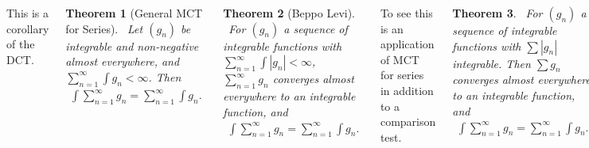 \documentclass{tikzposter} %
\newtheorem{theorem}{Theorem}
\begin{document}
\begin{columns}
{    This is a corollary of the DCT. \\

    \hphantom{}

    \begin{theorem}[General MCT for Series]
      \ Let $(g_{n})$ be integrable and non-negative almost everywhere, and $\sum_{n=1}^{\infty} \int g_{n} < \infty$. Then
      \begin{align*}
        \int \sum_{n=1}^{\infty} g_{n} = \sum_{n=1}^{\infty} \int g_{n}.
      \end{align*}
    \end{theorem}
    \hphantom{}

    \begin{theorem}[Beppo Levi]
      \ For $(g_{n})$ a sequence of integrable functions with $\sum_{n=1}^{\infty} \int |g_{n}| < \infty$, $\sum_{n=1}^{\infty} g_{n}$ converges almost everywhere to an integrable function, and
      \begin{align*}
        \int \sum_{n=1}^{\infty} g_{n} = \sum_{n=1}^{\infty} \int g_{n}.
      \end{align*}
    \end{theorem}
    \hphantom{}

    To see this is an application of MCT for series in addition to a comparison test. \\
    
    \begin{theorem}
    \ For $(g_{n})$ a sequence of integrable functions with $\sum |g_{n}|$ integrable. Then $\sum g_{n}$ converges almost everywhere to an integrable function, and
    \begin{align*}
      \int \sum_{n=1}^{\infty} g_{n} = \sum_{n=1}^{\infty} \int g_{n}.
    \end{align*}
    \end{theorem}
    \hphantom{}

    This follows by an application of Beppo Levi.
    }
\end{columns}
\end{document}
